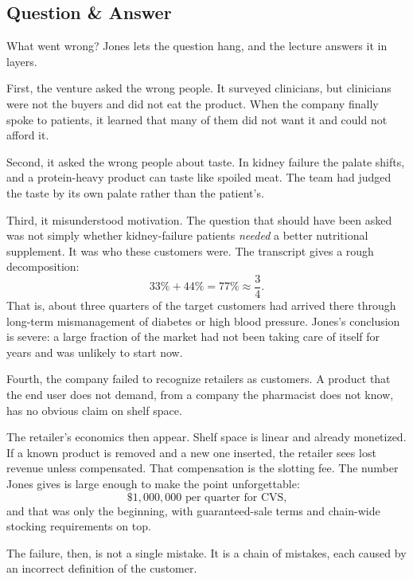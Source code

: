 \subsection{Question \& Answer}

What went wrong? Jones lets the question hang, and the lecture answers it in layers.

First, the venture asked the wrong people. It surveyed clinicians, but clinicians were not the buyers and did not eat the product. When the company finally spoke to patients, it learned that many of them did not want it and could not afford it.

Second, it asked the wrong people about taste. In kidney failure the palate shifts, and a protein-heavy product can taste like spoiled meat. The team had judged the taste by its own palate rather than the patient's.

Third, it misunderstood motivation. The question that should have been asked was not simply whether kidney-failure patients \emph{needed} a better nutritional supplement. It was who these customers were. The transcript gives a rough decomposition:
\begin{equation}
33\%+44\%=77\%\approx \frac{3}{4}.
\end{equation}
That is, about three quarters of the target customers had arrived there through long-term mismanagement of diabetes or high blood pressure. Jones's conclusion is severe: a large fraction of the market had not been taking care of itself for years and was unlikely to start now.

Fourth, the company failed to recognize retailers as customers. A product that the end user does not demand, from a company the pharmacist does not know, has no obvious claim on shelf space.

The retailer's economics then appear. Shelf space is linear and already monetized. If a known product is removed and a new one inserted, the retailer sees lost revenue unless compensated. That compensation is the slotting fee. The number Jones gives is large enough to make the point unforgettable:
\begin{equation}
\$1{,}000{,}000 \text{ per quarter for CVS,}
\end{equation}
and that was only the beginning, with guaranteed-sale terms and chain-wide stocking requirements on top.

The failure, then, is not a single mistake. It is a chain of mistakes, each caused by an incorrect definition of the customer.

